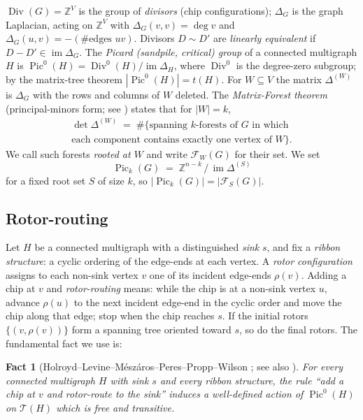 \documentclass[11pt]{article}
\newcommand{\Z}{\mathbb{Z}}
\newcommand{\PicO}[1]{\operatorname{Pic}^0(#1)}
\newcommand{\Pick}[1]{\operatorname{Pic}_k(#1)}
\newcommand{\im}{\operatorname{im}}
\newcommand{\Tcal}{\mathcal{T}}
\newcommand{\Fcal}{\mathcal{F}}
\newtheorem{fact}[theorem]{Fact}
\begin{document}
$\operatorname{Div}(G) = \Z^V$ is the group of \emph{divisors} (chip
configurations); $\Delta_G$ is the graph Laplacian, acting on $\Z^V$ with
$\Delta_G(v,v) = \deg v$ and $\Delta_G(u,v) = -(\text{\# edges } uv)$.
Divisors $D \sim D'$ are \emph{linearly equivalent} if
$D - D' \in \im \Delta_G$. The \emph{Picard (sandpile, critical) group} of a
connected multigraph $H$ is
$\PicO{H} = \operatorname{Div}^0(H) / \im \Delta_H$, where
$\operatorname{Div}^0$ is the degree-zero subgroup; by the matrix-tree
theorem $|\PicO{H}| = t(H)$. For $W \subseteq V$ the matrix $\Delta^{(W)}$
is $\Delta_G$ with the rows and columns of $W$ deleted. The
\emph{Matrix-Forest theorem} (principal-minors form; see
\cite{chebotarev2006forest}) states that for $|W| = k$,
\[
\begin{gathered}
  \det \Delta^{(W)}
    \;=\; \#\bigl\{\text{spanning $k$-forests of $G$ in which} \\
    \text{each component contains exactly one vertex of } W\bigr\}.
\end{gathered}
\]
We call such forests \emph{rooted at $W$} and write $\Fcal_W(G)$ for
their set. We set
\[
  \Pick{G} \;=\; \Z^{n-k} \,/\, \im \Delta^{(S)}
\]
for a fixed root set $S$ of size $k$, so $|\Pick{G}| = |\Fcal_S(G)|$.

\subsection{Rotor-routing}

Let $H$ be a connected multigraph with a distinguished \emph{sink} $s$, and
fix a \emph{ribbon structure}: a cyclic ordering of the edge-ends at each
vertex. A \emph{rotor configuration} assigns to each non-sink vertex $v$ one
of its incident edge-ends $\rho(v)$. Adding a chip at $v$ and
\emph{rotor-routing} means: while the chip is at a non-sink vertex $u$,
advance $\rho(u)$ to the next incident edge-end in the cyclic order and move
the chip along that edge; stop when the chip reaches $s$. If the initial
rotors $\{(v, \rho(v))\}$ form a spanning tree oriented toward $s$, so do the
final rotors. The fundamental fact we use is:

\begin{fact}[{Holroyd--Levine--M\'esz\'aros--Peres--Propp--Wilson
\cite{holroyd2008chip}; see also \cite[Thm.~2.18]{ganguly2023rotor}}]
\label{fact:hlmppw}
For every connected multigraph $H$ with sink $s$ and every ribbon structure,
the rule ``add a chip at $v$ and rotor-route to the sink'' induces a
well-defined action of $\PicO{H}$ on $\Tcal(H)$ which is free and
transitive.
\end{fact}
\end{document}
